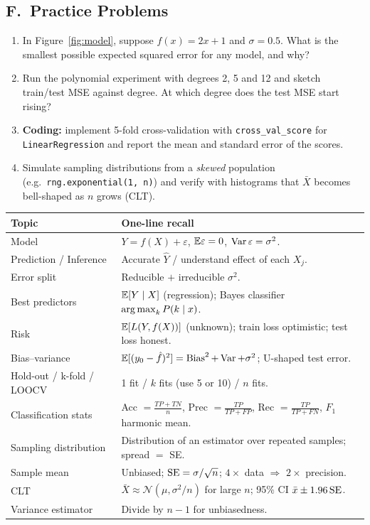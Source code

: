 \subsection*{F.\ Practice Problems}
\begin{enumerate}
  \item In Figure~\ref{fig:model}, suppose $f(x)=2x+1$ and $\sigma=0.5$. What is the smallest possible expected squared error for any model, and why?
  \item Run the polynomial experiment with degrees 2, 5 and 12 and sketch train/test MSE against degree. At which degree does the test MSE start rising?
  \item \textbf{Coding:} implement 5-fold cross-validation with \texttt{cross\_val\_score} for \texttt{LinearRegression} and report the mean and standard error of the scores.
  \item Simulate sampling distributions from a \emph{skewed} population (e.g.\ \texttt{rng.exponential(1, n)}) and verify with histograms that $\bar X$ becomes bell-shaped as $n$ grows (CLT).
\end{enumerate}

\begin{revision}
\begin{center}\small
\begin{tabular}{@{}p{3.6cm}p{9.6cm}@{}}
\toprule
\textbf{Topic} & \textbf{One-line recall}\\
\midrule
Model & $Y=f(X)+\varepsilon$, $\mathbb{E}\varepsilon=0$, $\operatorname{Var}\varepsilon=\sigma^2$.\\
Prediction / Inference & Accurate $\hat Y$ / understand effect of each $X_j$.\\
Error split & Reducible $+$ irreducible $\sigma^2$.\\
Best predictors & $\mathbb{E}[Y\mid X]$ (regression); Bayes classifier $\operatorname*{arg\,max}_k P(k\mid x)$.\\
Risk & $\mathbb{E}[L(Y,f(X))]$ (unknown); train loss optimistic; test loss honest.\\
Bias--variance & $\mathbb{E}[(y_0-\hat f)^2]=\operatorname{Bias}^2+\operatorname{Var}+\sigma^2$; U-shaped test error.\\
Hold-out / k-fold / LOOCV & 1 fit / $k$ fits (use 5 or 10) / $n$ fits.\\
Classification stats & Acc $=\frac{TP+TN}{n}$, Prec $=\frac{TP}{TP+FP}$, Rec $=\frac{TP}{TP+FN}$, $F_1$ harmonic mean.\\
Sampling distribution & Distribution of an estimator over repeated samples; spread $=$ SE.\\
Sample mean & Unbiased; $\operatorname{SE}=\sigma/\sqrt n$; $4\times$ data $\Rightarrow$ $2\times$ precision.\\
CLT & $\bar X\approx\mathcal N(\mu,\sigma^2/n)$ for large $n$; 95\% CI $\bar x\pm1.96\operatorname{SE}$.\\
Variance estimator & Divide by $n-1$ for unbiasedness.\\
\bottomrule
\end{tabular}
\end{center}
\end{revision}
